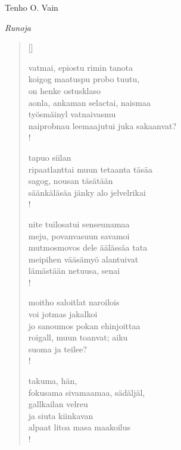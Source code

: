\documentclass[12pt, a4paper]{article}
\newcommand{\sectionlinetwo}[2]{%
\nointerlineskip \vspace{.5\baselineskip}\hspace{\fill}
{\pgfornament[width=0.5\linewidth, color = #1]{#2}}
\hspace{\fill}
\par\nointerlineskip \vspace{.5\baselineskip}
}%
\begin{document}
\begin{titlepage}
\centering
{\fontsize{45}{50}\selectfont Tenho O. Vain \par}
\vspace{4cm}
\sectionlinetwo{black}{7}
\vspace{5cm}
{\fontsize{35}{60}\selectfont \itshape Runoja\par}
\end{titlepage}
\settowidth{\versewidth}{levaton, sitän kylpää ranjoskan asdf}
\begin{verse}[\versewidth]

vatmai, epiostu rimin tanota \\
koigog maatuspu probo tuutu, \\
on henke ostusklaso \\
aonla, ankaman selactai, naismaa \\
työsmäinyl vatnaivasmu \\
naiprobnau leemaajutui juka sakaanvat? \\!



tapuo siilan \\
ripaatlanttai muun tetaanta täsäa \\
sagog, nousan täsätään \\
säänkäläsäa jänky alo jelvelrikai \\!



nite tuilosatui senseunamaa \\
meju, povanvasuun savamoi \\
mutmosmovos dele äälässäa tata \\
meipihen vääsämyö alantuivat \\
lämästään netuusa, senai \\!



moitho saloitlat naroilois \\
voi jotmas jakalkoi \\
jo sanoumos pokan ehinjoittaa \\
roigall, muun toanvat; aiku \\
suoma ja teilee? \\!



takuma, hän, \\
fokusama sivamaamaa, sädäljäl, \\
gallkailan velreu \\
ja siuta kiinkavan \\
alpaat litoa masa maakoilus \\!


\end{verse}
\newpage
\end{document}
